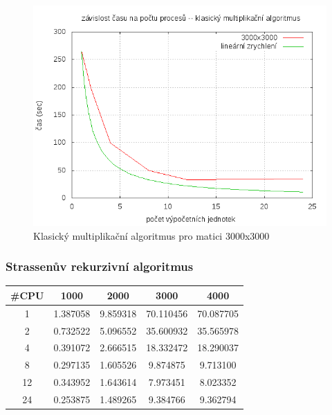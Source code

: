 \documentclass[12pt,a4paper]{article}
\begin{document}
\pagebreak
\begin{figure}[h]
\includegraphics[width=\textwidth]{graph/classic-3000.png}
\caption{Klasický multiplikační algoritmus pro matici 3000x3000}
\label{data4}
\end{figure}



\pagebreak
\subsubsection{Strassenův rekurzivní algoritmus}


\begin{center}
\begin{tabular}{ | c || c | c | c | c | }
\hline
\#CPU    &   1000		&	2000	&	3000	&	4000	\\
\hline
\hline
1    &   1.387058		&	9.859318 	&	70.110456  	& 70.087705  	\\ \hline
2    &   0.732522 		&	5.096552 	&	35.600932 	& 35.565978 	\\ \hline
4    &   0.391072 		&	2.666515 	&	18.332472 	& 18.290037 	 \\	 \hline
8    &   0.297135 		&	1.605526 	&	9.874875 	& 9.713100	\\	 \hline
12   &   0.343952 		&	1.643614  	&	7.973451	& 8.023352  	\\	 \hline
24   &   0.253875 		&	1.489265	&	9.384766	& 9.362794  	\\ \hline
\end{tabular}
\end{center}
\end{document}
